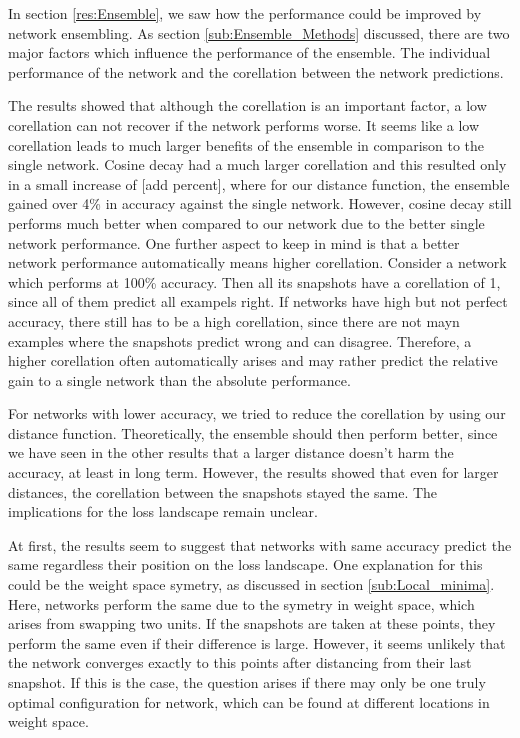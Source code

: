 In section \ref{res:Ensemble}, we saw how the performance could be improved by
network ensembling. As section \ref{sub:Ensemble_Methods} discussed, there are
two major factors which influence the performance of the ensemble. The
individual performance of the network and the corellation between the network
predictions.

The results showed that although the corellation is an important factor, a low
corellation can not recover if the network performs worse. It seems like a low
corellation leads to much larger benefits of the ensemble in comparison to the
single network. Cosine decay had a much larger corellation and this resulted
only in a small increase of [add percent], where for our distance function, the
ensemble gained over 4\% in accuracy against the single network. However, cosine
decay still performs much better when compared to our network due to the better
single network performance. One further aspect to keep in mind is that a better
network performance automatically means higher corellation. Consider a network
which performs at 100\% accuracy. Then all its snapshots have a corellation of
1, since all of them predict all exampels right. If networks have high but not
perfect accuracy, there still has to be a high corellation, since there are not
mayn examples where the snapshots predict wrong and can disagree. Therefore, a
higher corellation often automatically arises and may rather predict the
relative gain to a single network than the absolute performance.

For networks with lower accuracy, we tried to reduce the corellation by using
our distance function. Theoretically, the ensemble should then perform better,
since we have seen in the other results that a larger distance doesn't harm the
accuracy, at least in long term. However, the results showed that even for
larger distances, the corellation between the snapshots stayed the same. The
implications for the loss landscape remain unclear.

At first, the results seem to suggest that networks with same accuracy predict
the same regardless their position on the loss landscape. One explanation for
this could be the weight space symetry, as discussed in section
\ref{sub:Local_minima}. Here, networks perform the same due to the symetry in
weight space, which arises from swapping two units. If the snapshots are taken
at these points, they perform the same even if their difference is large.
However, it seems unlikely that the network converges exactly to this points
after distancing from their last snapshot. If this is the case, the question
arises if there may only be one truly optimal configuration for network, which
can be found at different locations in weight space.

